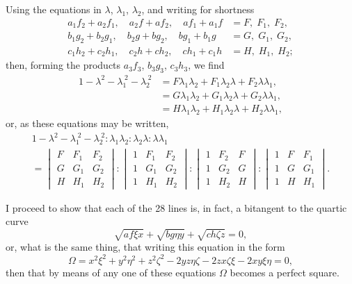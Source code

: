 \documentclass[11pt,a4paper]{book}
\begin{document}
Using the equations in $\lambda$, $\lambda_1$, $\lambda_2$, and writing for shortness
\begin{align*}
a_1f_2 + a_2f_1,\quad a_2f + af_2,\quad af_1 + a_1f &= F,\;F_1,\;F_2,\\
b_1g_2 + b_2g_1,\quad b_2g + bg_2,\quad bg_1 + b_1g &= G,\;G_1,\;G_2,\\
c_1h_2 + c_2h_1,\quad c_2h + ch_2,\quad ch_1 + c_1h &= H,\;H_1,\;H_2;
\end{align*}
then, forming the products $a_3f_3$, $b_3g_3$, $c_3h_3$, we find
\begin{align*}
1 - \lambda^2 - \lambda_1^{\;2} - \lambda_2^{\;2} &= F\lambda_1\lambda_2 + F_1\lambda_2\lambda + F_2\lambda\lambda_1,\\
&= G\lambda_1\lambda_2 + G_1\lambda_2\lambda + G_2\lambda\lambda_1,\\
&= H\lambda_1\lambda_2 + H_1\lambda_2\lambda + H_2\lambda\lambda_1,
\end{align*}
or, as these equations may be written,
\begin{multline*}
1 - \lambda^2 - \lambda_1^{\;2} - \lambda_2^{\;2} : \lambda_1\lambda_2 : \lambda_2\lambda : \lambda\lambda_1\\
= \begin{vmatrix} F & F_1 & F_2 \\ G & G_1 & G_2 \\ H & H_1 & H_2 \end{vmatrix}
: \begin{vmatrix} 1 & F_1 & F_2 \\ 1 & G_1 & G_2 \\ 1 & H_1 & H_2 \end{vmatrix}
: \begin{vmatrix} 1 & F_2 & F \\ 1 & G_2 & G \\ 1 & H_2 & H \end{vmatrix}
: \begin{vmatrix} 1 & F & F_1 \\ 1 & G & G_1 \\ 1 & H & H_1 \end{vmatrix}.
\end{multline*}

I proceed to show that each of the 28 lines is, in fact, a bitangent to the quartic curve
\[
\sqrt{af\xi x} + \sqrt{bg\eta y} + \sqrt{ch\zeta z} = 0,
\]
or, what is the same thing, that writing this equation in the form
\[
\Omega = x^2\xi^2 + y^2\eta^2 + z^2\zeta^2 - 2yz\eta\zeta - 2zx\zeta\xi - 2xy\xi\eta = 0,
\]
then that by means of any one of these equations $\Omega$ becomes a perfect square.
\end{document}
